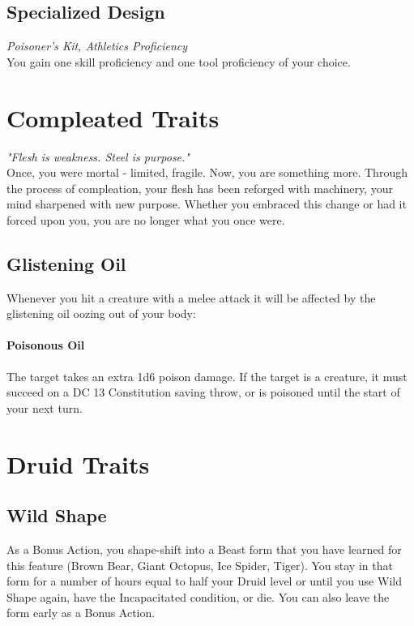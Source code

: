 \documentclass[letterpaper,openany,oneside,twocolumn]{book}
\begin{document}
\subsection*{Specialized Design}
\textit{Poisoner's Kit, Athletics Proficiency}\\
You gain one skill proficiency and one tool proficiency of your choice.

\section*{Compleated Traits}
\textit{"Flesh is weakness. Steel is purpose."}\\
Once, you were mortal - limited, fragile. Now, you are something more. Through the process of compleation, your flesh has been reforged with machinery, your mind sharpened with new purpose. Whether you embraced this change or had it forced upon you, you are no longer what you once were.
\subsection*{Glistening Oil}
Whenever you hit a creature with a melee attack it will be affected by the glistening oil oozing out of your body:
\paragraph*{Poisonous Oil} The target takes an extra 1d6 poison damage. If the target is a creature, it must succeed on a DC 13 Constitution saving throw, or is poisoned until the start of your next turn.

\section*{Druid Traits}
\subsection*{Wild Shape}
As a Bonus Action, you shape-shift into a Beast form that you have learned for this feature (Brown Bear, Giant Octopus, Ice Spider, Tiger). You stay in that form for a number of hours equal to half your Druid level or until you use Wild Shape again, have the Incapacitated condition, or die. You can also leave the form early as a Bonus Action.
\end{document}
